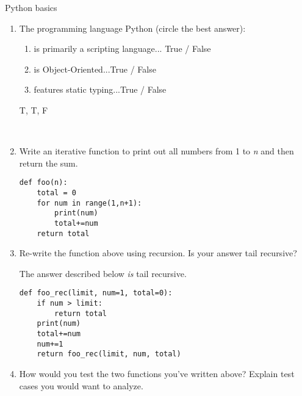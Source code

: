 Python basics
\begin{enumerate}
\item The programming language Python (circle the best answer):\\
\begin{enumerate}
\item is primarily a scripting language...	\hspace{40mm}True / False\\
\item is Object-Oriented...\hspace{65mm}True / False\\
\item features static typing...\hspace{61mm}True / False\\
\end{enumerate}
\begin{answer}
T, T, F
\end{answer}
\\
\item Write an iterative function to print out all numbers from 1 to \emph{n} and then return the sum.

\begin{answer}
\begin{lstlisting}
def foo(n):
	total = 0
	for num in range(1,n+1):
		print(num)
		total+=num
	return total
\end{lstlisting}
\end{answer}

\item Re-write the function above using recursion. Is your answer tail recursive?

\begin{answer}
The answer described below \emph{is} tail recursive.
\begin{lstlisting}
def foo_rec(limit, num=1, total=0):
	if num > limit:
		return total
	print(num)
	total+=num
	num+=1
	return foo_rec(limit, num, total)
\end{lstlisting}
\end{answer}

\item How would you test the two functions you've written above? Explain test cases you would want to analyze.


\end{enumerate}
